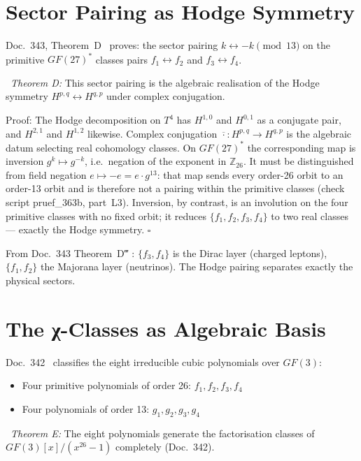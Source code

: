 \section{Sector Pairing as Hodge Symmetry}

Doc.~343, Theorem~D \BM\ proves: the sector pairing $k \leftrightarrow -k
\pmod{13}$ on the primitive $GF(27)^*$ classes pairs $f_1 \leftrightarrow f_2$
and $f_3 \leftrightarrow f_4$.

\BM\ \textit{Theorem D:} This sector pairing is the algebraic realisation of
the Hodge symmetry $H^{p,q} \leftrightarrow H^{q,p}$ under complex conjugation.

Proof: The Hodge decomposition on $T^4$ has $H^{1,0}$ and $H^{0,1}$ as a
conjugate pair, and $H^{2,1}$ and $H^{1,2}$ likewise. Complex conjugation
$\overline{\cdot}: H^{p,q} \to H^{q,p}$ is the algebraic datum selecting
real cohomology classes. On $GF(27)^*$ the corresponding map is inversion
$g^k \mapsto g^{-k}$, i.e.\ negation of the exponent in $\mathbb{Z}_{26}$.
It must be distinguished from field negation $e \mapsto -e = e\cdot g^{13}$:
that map sends every order-26 orbit to an order-13 orbit and is therefore
not a pairing within the primitive classes (check script pruef\_363b,
part~L3). Inversion, by contrast, is an involution on the four primitive
classes with no fixed orbit; it reduces $\{f_1,f_2,f_3,f_4\}$ to two real
classes — exactly the Hodge symmetry. \hfill$\square$

From Doc.~343 Theorem~D‴ \BM: $\{f_3,f_4\}$ is the Dirac layer (charged
leptons), $\{f_1,f_2\}$ the Majorana layer (neutrinos). The Hodge pairing
separates exactly the physical sectors.

\section{The χ-Classes as Algebraic Basis}

Doc.~342 \BM\ classifies the eight irreducible cubic polynomials over $GF(3)$:
\begin{itemize}
\item Four primitive polynomials of order 26: $f_1,f_2,f_3,f_4$
\item Four polynomials of order 13: $g_1,g_2,g_3,g_4$
\end{itemize}

\BM\ \textit{Theorem E:} The eight polynomials generate the factorisation
classes of $GF(3)[x]/(x^{26}-1)$ completely (Doc.~342).


